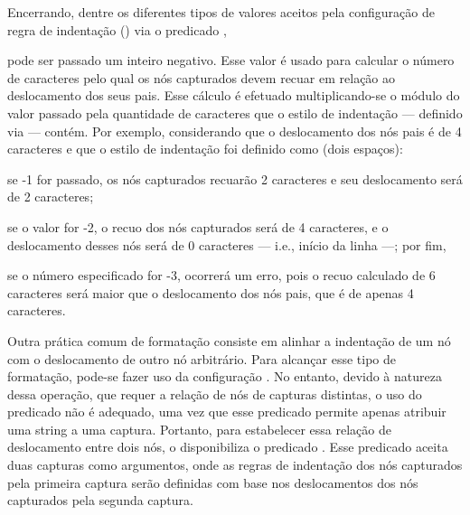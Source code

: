 \documentclass
  [11pt,a4paper,english,brazil,openright,sumario=tradicional,twoside]
  {abntex2}
\begin{document}
\begin{inparaenum}
          Encerrando, dentre os diferentes tipos de valores aceitos pela
          configuração de regra de indentação ()
          via o predicado ,
    \item pode ser passado um inteiro negativo. Esse valor é usado para
          calcular o número de caracteres pelo qual os nós capturados devem
          recuar em relação ao deslocamento dos seus pais. Esse cálculo é
          efetuado multiplicando-se o módulo do valor passado pela quantidade
          de caracteres que o estilo de indentação --- definido via
           --- contém. Por exemplo,
          considerando que o deslocamento dos nós pais é de 4 caracteres e que
          o estilo de indentação foi definido como 
          (dois espaços):
          \begin{inparaenum}
            \item se -1 for passado, os nós capturados recuarão 2 caracteres e
                  seu deslocamento será de 2 caracteres;
            \item se o valor for -2, o recuo dos nós capturados será de 4
                  caracteres, e o deslocamento desses nós será de 0 caracteres
                  --- i.e., início da linha ---; por fim,
            \item se o número especificado for -3, ocorrerá um erro, pois o
                  recuo calculado de 6 caracteres será maior que o deslocamento
                  dos nós pais, que é de apenas 4 caracteres.
          \end{inparaenum}
  \end{inparaenum}

  Outra prática comum de formatação consiste em alinhar a indentação de um nó
  com o deslocamento de outro nó arbitrário. Para alcançar esse tipo de
  formatação, pode-se fazer uso da configuração
  . No entanto, devido à natureza dessa
  operação, que requer a relação de nós de capturas distintas, o uso do
  predicado  não é adequado, uma vez que esse predicado
  permite apenas atribuir uma string a uma captura. Portanto, para estabelecer
  essa relação de deslocamento entre dois nós, o \witchcooking disponibiliza o
  predicado . Esse predicado aceita duas
  capturas como argumentos, onde as regras de indentação dos nós capturados
  pela primeira captura serão definidas com base nos deslocamentos dos nós
  capturados pela segunda captura.
\end{document}
